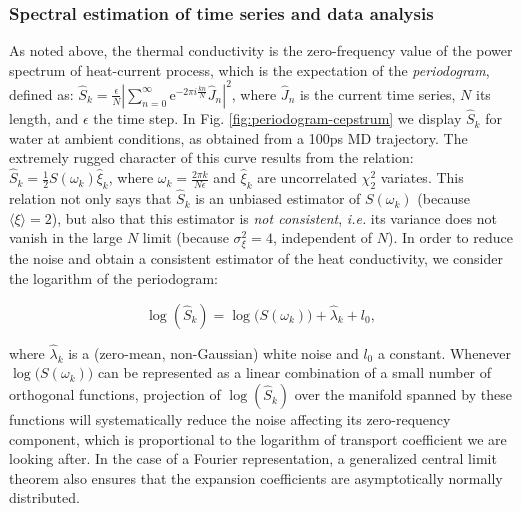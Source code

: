 \subsubsection{Spectral estimation of time series and data analysis}
As noted above, the thermal conductivity is the zero-frequency value of the power spectrum of heat-current process, which is the expectation of the \emph{periodogram}, defined as: $\hat S_k = \frac{\mathcal{\epsilon}}{N} \left | \sum_{n=0}^\infty  \mathrm{e}^{-2\pi i\frac{kn}{N}} \hat J_n \right |^2$, where $\hat J_n$ is the current time series, $N$ its length, and $\epsilon$ the time step. In Fig. \ref{fig:periodogram-cepstrum} we display $\hat S_k$ for water at ambient conditions, as obtained from a 100ps MD trajectory. The extremely rugged character of this curve results from the relation: $\hat S_k  =  \frac{1}{2}S(\omega_k)\hat\xi_k$, where $\omega_k=\frac{2\pi k}{N\epsilon}$ and $\hat\xi_k$ are uncorrelated $\chi^2_2$ variates.\cite{Anderson1971,Peligrad2010} This relation not only says that $\hat S_k$ is an unbiased estimator of $S(\omega_k)$ (because $\langle\xi\rangle = 2$), but also that this estimator is \emph{not consistent}, \emph{i.e.} its variance does not vanish in the large $N$ limit (because $\sigma^2_\xi=4$, independent of $N$). In order to reduce the noise and obtain a consistent estimator of the heat conductivity, we consider the logarithm of the periodogram:
\begin{linenomath}\begin{equation}
\log\left (\hat S_k \right ) = \log \bigl ( S(\omega_k) \bigr ) +\hat\lambda_k + l_0,
\end{equation}\end{linenomath}
where $\hat\lambda_k$ is a (zero-mean, non-Gaussian) white noise and $l_0$ a constant. Whenever $\log \bigl ( S(\omega_k) \bigr )$ can be represented as a linear combination of a small number of orthogonal functions, projection of $\log\left (\hat S_k \right )$ over the manifold spanned by these functions will systematically reduce the noise affecting its zero-requency component, which is proportional to the logarithm of transport coefficient we are looking after. In the case of a Fourier representation, a generalized central limit theorem also ensures that the expansion coefficients are asymptotically normally distributed.\cite{Anderson1971,Peligrad2010} 

